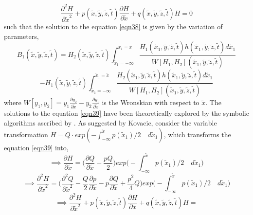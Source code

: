 \documentclass{article}
\begin{document}
\begin{equation} \label{eqn39}
\frac{\partial^2 H}{\partial \tilde{x}^2} + p(\tilde{x}, \tilde{y}, \tilde{z}, \tilde{t}) \frac{\partial H}{\partial \tilde{x}} + q(\tilde{x}, \tilde{y}, \tilde{z}, \tilde{t}) H = 0
\end{equation}
such that the solution to the equation \ref{eqn38} is given by the variation of parameters,
\begin{equation*}
B_1(\tilde{x}, \tilde{y}, \tilde{z}, \tilde{t}) = H_2(\tilde{x}, \tilde{y}, \tilde{z}, \tilde{t}) \int_{\tilde{x}_1 = -\infty}^{\tilde{x}_1 = \tilde{x}} \frac{H_1(\tilde{x}_1, \tilde{y}, \tilde{z}, \tilde{t})h(\tilde{x}_1, \tilde{y}, \tilde{z}, \tilde{t})d\tilde{x}_1}{W[H_1, H_2](\tilde{x}_1, \tilde{y}, \tilde{z}, \tilde{t})}
\end{equation*}
\begin{equation*}
 - H_1(\tilde{x}, \tilde{y}, \tilde{z}, \tilde{t}) \int_{\tilde{x}_1 = -\infty}^{\tilde{x}_1 = \tilde{x}} \frac{H_2(\tilde{x}_1, \tilde{y}, \tilde{z}, \tilde{t})h(\tilde{x}_1, \tilde{y}, \tilde{z}, \tilde{t})d\tilde{x}_1}{W[H_1, H_2](\tilde{x}_1, \tilde{y}, \tilde{z}, \tilde{t})}
\end{equation*}
where $W[y_1, y_2] = y_1 \frac{\partial y_2}{\partial \tilde{x}} - y_2 \frac{\partial y_1}{\partial \tilde{x}}$ is the Wronskian with respect to $\tilde{x}$. The solutions to the equation \ref{eqn39} have been theoretically explored by the symbolic algorithms ascribed by \cite{galoistheory, kovacic}. As suggested by Kovacic, consider the variable transformation $H = Q \cdot exp(-\int_{-\infty}^{\tilde{x}} p(\tilde{x}_1)/2 \quad d\tilde{x}_1)$, which transforms the equation \ref{eqn39} into,
\begin{equation*}
\implies \frac{\partial H}{\partial \tilde{x}} = \bigg(\frac{\partial Q}{\partial \tilde{x}}-\frac{pQ}{2}\bigg)exp\bigg(-\int_{-\infty}^{\tilde{x}} p(\tilde{x}_1)/2 \quad d\tilde{x}_1\bigg)
\end{equation*}
\begin{equation*}
\implies \frac{\partial^2 H}{\partial \tilde{x}^2} = \bigg(\frac{\partial^2 Q}{\partial \tilde{x}^2}-\frac{Q}{2}\frac{\partial p}{\partial \tilde{x}}-p\frac{\partial Q}{\partial \tilde{x}}+\frac{p^2}{4}Q\bigg)exp\bigg(-\int_{-\infty}^{\tilde{x}} p(\tilde{x}_1)/2 \quad d\tilde{x}_1\bigg)
\end{equation*}
\begin{equation*}
\implies \frac{\partial^2 H}{\partial \tilde{x}^2} + p(\tilde{x}, \tilde{y}, \tilde{z}, \tilde{t}) \frac{\partial H}{\partial \tilde{x}} + q(\tilde{x}, \tilde{y}, \tilde{z}, \tilde{t}) H = 
\end{equation*}
\end{document}
